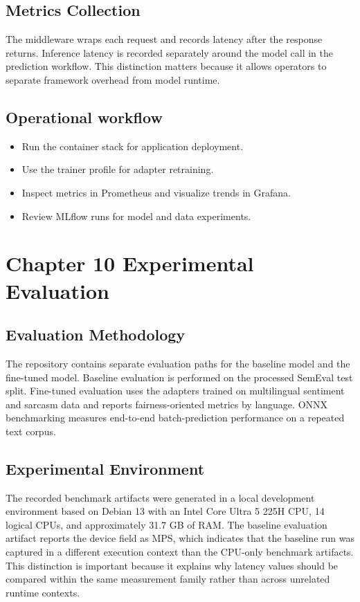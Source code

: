 \documentclass[12pt, a4paper]{article}
\begin{document}
\subsection{Metrics Collection}
The middleware wraps each request and records latency after the response returns. Inference latency is recorded separately around the model call in the prediction workflow. This distinction matters because it allows operators to separate framework overhead from model runtime.

\subsection{Operational workflow}
\begin{itemize}[noitemsep]
  \item Run the container stack for application deployment.
  \item Use the trainer profile for adapter retraining.
  \item Inspect metrics in Prometheus and visualize trends in Grafana.
  \item Review MLflow runs for model and data experiments.
\end{itemize}

\section{Chapter 10 Experimental Evaluation}

\subsection{Evaluation Methodology}
The repository contains separate evaluation paths for the baseline model and the fine-tuned model. Baseline evaluation is performed on the processed SemEval test split. Fine-tuned evaluation uses the adapters trained on multilingual sentiment and sarcasm data and reports fairness-oriented metrics by language. ONNX benchmarking measures end-to-end batch-prediction performance on a repeated text corpus.

\subsection{Experimental Environment}
The recorded benchmark artifacts were generated in a local development environment based on Debian 13 with an Intel Core Ultra 5 225H CPU, 14 logical CPUs, and approximately 31.7 GB of RAM. The baseline evaluation artifact reports the device field as MPS, which indicates that the baseline run was captured in a different execution context than the CPU-only benchmark artifacts. This distinction is important because it explains why latency values should be compared within the same measurement family rather than across unrelated runtime contexts.
\end{document}

